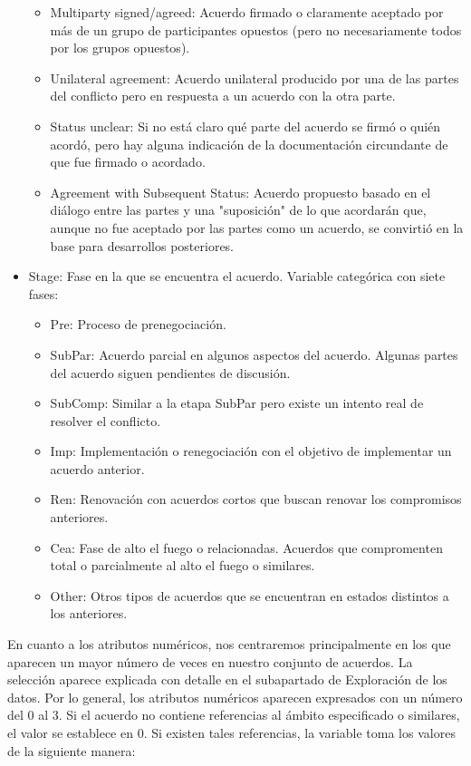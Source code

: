 \documentclass[11pt]{article}
\providecommand{\tightlist}{%
      \setlength{\itemsep}{0pt}\setlength{\parskip}{0pt}}
\begin{document}
\begin{itemize}
  \begin{itemize}
  \tightlist
  \item
    Multiparty signed/agreed: Acuerdo firmado o claramente aceptado por
    más de un grupo de participantes opuestos (pero no necesariamente
    todos por los grupos opuestos).
  \item
    Unilateral agreement: Acuerdo unilateral producido por una de las partes del conflicto
    pero en respuesta a un acuerdo con la otra parte.
  \item
    Status unclear: Si no está claro qué parte del acuerdo se firmó o
    quién acordó, pero hay alguna indicación de la documentación
    circundante de que fue firmado o acordado.
  \item
    Agreement with Subsequent Status: Acuerdo propuesto basado en el
    diálogo entre las partes y una "suposición" de lo que acordarán que,
    aunque no fue aceptado por las partes como un acuerdo, se convirtió en
    la base para desarrollos posteriores.
  \end{itemize}
\item
  Stage: Fase en la que se encuentra el acuerdo. Variable categórica con
  siete fases:

  \begin{itemize}
  \tightlist
  \item
    Pre: Proceso de prenegociación.
  \item
    SubPar: Acuerdo parcial en algunos aspectos del acuerdo. Algunas
    partes del acuerdo siguen pendientes de discusión.
  \item
    SubComp: Similar a la etapa SubPar pero existe un intento real de
    resolver el conflicto.
  \item
    Imp: Implementación o renegociación con el objetivo de implementar
    un acuerdo anterior.
  \item
    Ren: Renovación con acuerdos cortos que buscan renovar los
    compromisos anteriores.
  \item
    Cea: Fase de alto el fuego o relacionadas. Acuerdos que compromenten
    total o parcialmente al alto el fuego o similares.
  \item
    Other: Otros tipos de acuerdos que se encuentran en estados
    distintos a los anteriores.
  \end{itemize}
\end{itemize}

En cuanto a los atributos numéricos, nos centraremos principalmente en los
que aparecen un mayor número de veces en nuestro conjunto de acuerdos.
La selección aparece explicada con detalle en el subapartado de Exploración de
los datos. Por lo general, los atributos numéricos aparecen expresados con un
número del 0 al 3. Si el acuerdo no contiene referencias al ámbito
especificado o similares, el valor se establece en 0. Si existen tales
referencias, la variable toma los valores de la siguiente manera:
\end{document}
